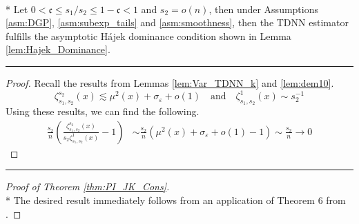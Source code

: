 \begin{lem}\label{lem:TDNN_Hajek_Dominance}\mbox{}\\*
	Let $0 < \mathfrak{c} \leq s_1/s_2 \leq 1 - \mathfrak{c} < 1$ and $s_2 = o(n)$, then under Assumptions \ref{asm:DGP}, \ref{asm:subexp_tails} and \ref{asm:smoothness}, then the TDNN estimator fulfills the asymptotic H\'ajek dominance condition shown in Lemma \ref{lem:Hajek_Dominance}.
\end{lem}
\hrule
\begin{proof}
	Recall the results from Lemmas \ref{lem:Var_TDNN_k} and \ref{lem:dem10}.
	\begin{equation*}
		\zeta_{s_1, s_2}^{s_2}\left(x\right) \lesssim \mu^2(x) + \sigma_{\varepsilon} + o(1)
		\quad \text{and} \quad
		\zeta_{s_1, s_2}^{1}\left(x\right) \sim s_2^{-1}
	\end{equation*}
	Using these results, we can find the following.
	\begin{equation}
		\begin{aligned}
			\frac{s_2}{n}\left(\frac{
				\zeta_{s_1, s_2}^{s_2}\left(x\right)}{s_2 \zeta_{s_1, s_2}^{1}\left(x\right)} - 1\right)
			 & \sim \frac{s_2}{n}\left(\mu^2(x) + \sigma_{\varepsilon} + o(1) - 1\right)
			\sim \frac{s_2}{n} \rightarrow 0
		\end{aligned}
	\end{equation}
\end{proof}
\hrule

\begin{proof}[Proof of Theorem \ref{thm:PI_JK_Cons}]\mbox{}\\*
	The desired result immediately follows from an application of Theorem 6 from \citet{peng_bias_2021}.
\end{proof}

